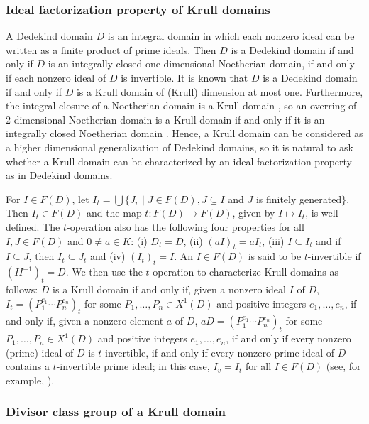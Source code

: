 \documentclass[10pt]{article}
\numberwithin{equation}{section}
\theoremstyle{definition}
\theoremstyle{definition}
\begin{document}
\subsubsection{Ideal factorization property of Krull domains}

A Dedekind domain $D$ is an integral domain in which each nonzero ideal  can be written as a finite product of prime ideals. Then
$D$ is a Dedekind domain if and only if $D$ is an integrally closed one-dimensional Noetherian domain, if and only if each nonzero ideal of $D$ is invertible. It is known that $D$ is a Dedekind domain if and only if 
$D$ is a Krull domain of (Krull) dimension at most one. Furthermore, 
 the integral closure of a Noetherian domain is a Krull domain 
\cite[Theorem 2]{n55}, so 
an overring of $2$-dimensional Noetherian domain is a Krull domain if and only if it is an integrally closed Noetherian domain \cite[Theorem 9]{Heinzer}. Hence, a Krull domain can be considered as a higher dimensional generalization of Dedekind domains, so it is natural to ask whether a Krull domain can be characterized by an ideal factorization property as in Dedekind domains. 
 
For $I \in F(D)$, let $I_t = \bigcup\{J_v \mid J \in F(D), J \subseteq I$ and $J$ is finitely generated$\}$. Then $I_t \in F(D)$ and the map $t: F(D) \rightarrow F(D)$, given by $I \mapsto I_t$, is well defined. 
The $t$-operation also has the following four properties for all $I, J \in F(D)$ and $0 \neq a \in K$: (i) $D_t = D$, (ii) $(aI)_t = aI_t$, (iii) $I \subseteq I_t$ and if $I \subseteq J$, then $I_t \subseteq J_t$ and (iv) $(I_t)_t = I$. An $I \in F(D)$ 
is said to be $t$-invertible if $(II^{-1})_t = D$. 
 We then use the $t$-operation to characterize Krull domains as follows: $D$ is a Krull domain if and only if, given a nonzero ideal $I$ of $D$, 
$I_t = (P_1^{e_1} \cdots P_n^{e_n})_t$ for some $P_1, \dots , P_n \in X^1(D)$ and positive integers $e_1, \dots, e_n$, 
if and only if, given a nonzero element $a$ of $D$, 
$aD = (P_1^{e_1} \cdots P_n^{e_n})_t$ for some $P_1, \dots , P_n \in X^1(D)$ and positive integers $e_1, \dots, e_n$,
if and only if every nonzero (prime) ideal of $D$ is $t$-invertible,
 if and only if every nonzero prime ideal of $D$ contains a $t$-invertible prime ideal;
in this case, $I_v = I_t$ for all $I \in F(D)$ (see, for example, \cite{k89}).


\subsubsection{Divisor class group of a Krull domain}
\end{document}
